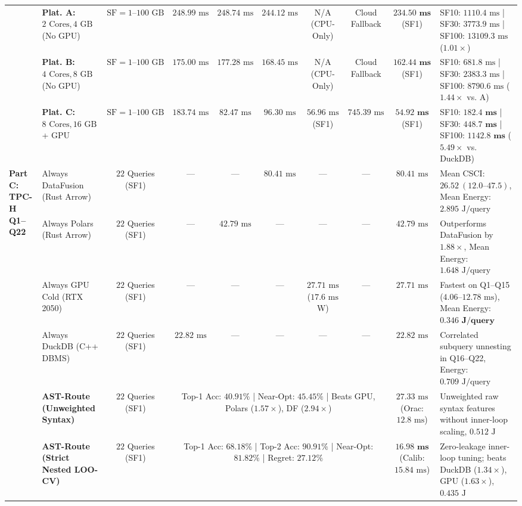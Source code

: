 \documentclass[10pt,a4paper]{article}
\newenvironment{fitasttable}{%
  \begin{lrbox}{\asttblbox}%
}{%
  \end{lrbox}%
  \sbox{\asttblboxB}{%
    \ifdim\wd\asttblbox>0.96\textwidth
      \resizebox{0.96\textwidth}{!}{\usebox{\asttblbox}}%
    \else
      \usebox{\asttblbox}%
    \fi
  }%
  \ifdim\ht\asttblboxB>0.72\textheight
    \resizebox{!}{0.72\textheight}{\usebox{\asttblboxB}}%
  \else
    \usebox{\asttblboxB}%
  \fi
}
\begin{document}
\begin{table}[!htbp]
\begin{fitasttable}
\begin{tabular}{@{}llcccccccl@{}}
 & \textbf{Plat. A:} $2\text{ Cores}, 4\text{ GB}$ (No GPU) & $\text{SF}=1\text{--}100\text{ GB}$ & $248.99\text{ ms}$ & $248.74\text{ ms}$ & $244.12\text{ ms}$ & N/A (CPU-Only) & Cloud Fallback & $\mathbf{234.50\text{ ms}}$ (SF1) & SF10: $1110.4\text{ ms}$ | SF30: $3773.9\text{ ms}$ | SF100: $13109.3\text{ ms}$ ($1.01\times$) \\
 & \textbf{Plat. B:} $4\text{ Cores}, 8\text{ GB}$ (No GPU) & $\text{SF}=1\text{--}100\text{ GB}$ & $175.00\text{ ms}$ & $177.28\text{ ms}$ & $168.45\text{ ms}$ & N/A (CPU-Only) & Cloud Fallback & $\mathbf{162.44\text{ ms}}$ (SF1) & SF10: $681.8\text{ ms}$ | SF30: $2383.3\text{ ms}$ | SF100: $8790.6\text{ ms}$ ($\mathbf{1.44\times}$ vs. A) \\
 & \textbf{Plat. C:} $8\text{ Cores}, 16\text{ GB}$ + GPU & $\text{SF}=1\text{--}100\text{ GB}$ & $183.74\text{ ms}$ & $82.47\text{ ms}$ & $96.30\text{ ms}$ & $56.96\text{ ms}$ (SF1) & $745.39\text{ ms}$ & $\mathbf{54.92\text{ ms}}$ (SF1) & SF10: $\mathbf{182.4\text{ ms}}$ | SF30: $\mathbf{448.7\text{ ms}}$ | SF100: $\mathbf{1142.8\text{ ms}}$ ($\mathbf{5.49\times}$ vs. DuckDB) \\
\midrule
\multirow{6}{*}{\textbf{Part C: TPC-H Q1--Q22}}
 & Always DataFusion (Rust Arrow) & $22$ Queries (SF1) & --- & --- & $80.41\text{ ms}$ & --- & --- & $80.41\text{ ms}$ & Mean CSCI: $26.52\ (12.0\text{--}47.5)$, Mean Energy: $2.895\text{ J/query}$ \\
 & Always Polars (Rust Arrow) & $22$ Queries (SF1) & --- & $42.79\text{ ms}$ & --- & --- & --- & $42.79\text{ ms}$ & Outperforms DataFusion by $1.88\times$, Mean Energy: $1.648\text{ J/query}$ \\
 & Always GPU Cold (RTX 2050) & $22$ Queries (SF1) & --- & --- & --- & $27.71\text{ ms}$ ($17.6\text{ ms}$ W) & --- & $27.71\text{ ms}$ & Fastest on Q1--Q15 ($4.06\text{--}12.78\text{ ms}$), Mean Energy: $\mathbf{0.346\text{ J/query}}$ \\
 & Always DuckDB (C++ DBMS) & $22$ Queries (SF1) & $22.82\text{ ms}$ & --- & --- & --- & --- & $22.82\text{ ms}$ & Correlated subquery unnesting in Q16--Q22, Energy: $0.709\text{ J/query}$ \\
 & \textbf{AST-Route (Unweighted Syntax)} & $22$ Queries (SF1) & \multicolumn{5}{c}{Top-1 Acc: $40.91\%$ | Near-Opt: $45.45\%$ | Beats GPU, Polars ($1.57\times$), DF ($2.94\times$)} & $27.33\text{ ms}$ (Orac: $12.8\text{ ms}$) & Unweighted raw syntax features without inner-loop scaling, $0.512\text{ J}$ \\
 & \textbf{AST-Route (Strict Nested LOO-CV)} & $22$ Queries (SF1) & \multicolumn{5}{c}{Top-1 Acc: $\mathbf{68.18\%}$ | Top-2 Acc: $\mathbf{90.91\%}$ | Near-Opt: $\mathbf{81.82\%}$ | Regret: $\mathbf{27.12\%}$} & $\mathbf{16.98\text{ ms}}$ (Calib: $15.84\text{ ms}$) & Zero-leakage inner-loop tuning; beats DuckDB ($1.34\times$), GPU ($1.63\times$), $0.435\text{ J}$ \\

\end{tabular}
\end{fitasttable}
\end{table}
\end{document}
